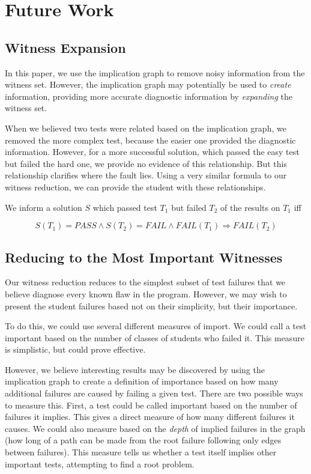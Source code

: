 \documentclass[11pt,twoside]{article}
\newcommand\fail{\mathit{FAIL}}
\theoremstyle{definition}
\begin{document}
\section{Future Work}
\subsection{Witness Expansion}

In this paper, we use the implication graph to remove noisy information from the witness set. However, the implication graph may potentially be used to \emph{create} information, providing more accurate diagnostic information by \emph{expanding} the witness set. 

When we believed two tests were related based on the implication graph, we removed the more complex test, because the easier one provided the diagnostic information. However, for a more successful solution, which passed the easy test but failed the hard one, we provide no evidence of this relationship. But this relationship clarifies where the fault lies. Using a very similar formula to our witness reduction, we can provide the student with these relationships.

\centerline{We inform a solution $S$ which passed test $T_1$ but failed $T_2$ of the results on  $T_1$ iff}
$$ S(T_1) = PASS \wedge S(T_2) = \fail \wedge \fail(T_1) \Rightarrow \fail(T_2)$$

\subsection{Reducing to the Most Important Witnesses}
Our witness reduction reduces to the simplest subset of test failures that we believe diagnose every known flaw in the program. However, we may wish to present the student failures based not on their simplicity, but their importance.

To do this, we could use several different measures of import. We could call a test important based on the number of classes of students who failed it. This measure is simplistic, but could prove effective.

However, we believe interesting results may be discovered by using the implication graph to create a definition of importance based on how many additional failures are caused by failing a given test. There are two possible ways to measure this. First, a test could be called important based on the number of failures it implies. This gives a direct measure of how many different failures it causes. We could also measure based on the \emph{depth} of implied failures in the graph (how long of a path can be made from the root failure following only edges between failures). This measure tells us whether a test itself implies other important tests, attempting to find a root problem.
\end{document}
